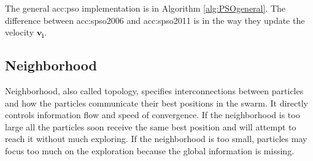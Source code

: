 The general \acrshort{acc:pso} implementation is in Algorithm \ref{alg:PSOgeneral}. The difference between \acrshort{acc:spso2006} and \acrshort{acc:spso2011} is in the way they update the velocity $\mathbf{v_i}$.

\subsection{Neighborhood}
\label{chap:psoneig}

Neighborhood, also called topology, specifies interconnections between particles and how the particles communicate their best positions in the swarm. It directly controls information flow and speed of convergence. If the neighborhood is too large all the particles soon receive the same best position and will attempt to reach it without much exploring. If the neighborhood is too small, particles may focus too much on the exploration because the global information is missing.

